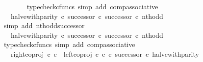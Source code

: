 \begin{isabellebody}
\ \ \ \ \ \ \isamarkupfalse%
\ {\isacharparenleft}{\kern0pt}typecheck{\isacharunderscore}{\kern0pt}cfuncs{\isacharcomma}{\kern0pt}\ simp\ add{\isacharcolon}{\kern0pt}\ comp{\isacharunderscore}{\kern0pt}associative{}{\isacharparenright}{\kern0pt}\isanewline
\ \ \ \ \isamarkupfalse%
\ \isamarkupfalse%
\ {\isachardoublequoteopen}{\isachardot}{\kern0pt}{\isachardot}{\kern0pt}{\isachardot}{\kern0pt}\ {\isacharequal}{\kern0pt}\ halve{\isacharunderscore}{\kern0pt}with{\isacharunderscore}{\kern0pt}parity\ {\isasymcirc}\isactrlsub c\ {\isacharparenleft}{\kern0pt}successor\ {\isasymcirc}\isactrlsub c\ successor{\isacharparenright}{\kern0pt}\ {\isasymcirc}\isactrlsub c\ nth{\isacharunderscore}{\kern0pt}odd{\isachardoublequoteclose}\isanewline
\ \ \ \ \ \ \isamarkupfalse%
\ {\isacharparenleft}{\kern0pt}simp\ add{\isacharcolon}{\kern0pt}\ nth{\isacharunderscore}{\kern0pt}odd{\isacharunderscore}{\kern0pt}successor{\isacharparenright}{\kern0pt}\isanewline
\ \ \ \ \isamarkupfalse%
\ \isamarkupfalse%
\ {\isachardoublequoteopen}{\isachardot}{\kern0pt}{\isachardot}{\kern0pt}{\isachardot}{\kern0pt}\ {\isacharequal}{\kern0pt}\ {\isacharparenleft}{\kern0pt}{\isacharparenleft}{\kern0pt}halve{\isacharunderscore}{\kern0pt}with{\isacharunderscore}{\kern0pt}parity\ {\isasymcirc}\isactrlsub c\ successor{\isacharparenright}{\kern0pt}\ {\isasymcirc}\isactrlsub c\ successor{\isacharparenright}{\kern0pt}\ {\isasymcirc}\isactrlsub c\ nth{\isacharunderscore}{\kern0pt}odd{\isachardoublequoteclose}\isanewline
\ \ \ \ \ \ \isamarkupfalse%
\ {\isacharparenleft}{\kern0pt}typecheck{\isacharunderscore}{\kern0pt}cfuncs{\isacharcomma}{\kern0pt}\ simp\ add{\isacharcolon}{\kern0pt}\ comp{\isacharunderscore}{\kern0pt}associative{}{\isacharparenright}{\kern0pt}\isanewline
\ \ \ \ \isamarkupfalse%
\ \isamarkupfalse%
\ {\isachardoublequoteopen}{\isachardot}{\kern0pt}{\isachardot}{\kern0pt}{\isachardot}{\kern0pt}\ {\isacharequal}{\kern0pt}\ {\isacharparenleft}{\kern0pt}{\isacharparenleft}{\kern0pt}right{\isacharunderscore}{\kern0pt}coproj\ {\isasymnat}\isactrlsub c\ {\isasymnat}\isactrlsub c\ {\isasymamalg}\ {\isacharparenleft}{\kern0pt}left{\isacharunderscore}{\kern0pt}coproj\ {\isasymnat}\isactrlsub c\ {\isasymnat}\isactrlsub c\ {\isasymcirc}\isactrlsub c\ successor{\isacharparenright}{\kern0pt}\ {\isasymcirc}\isactrlsub c\ halve{\isacharunderscore}{\kern0pt}with{\isacharunderscore}{\kern0pt}parity{\isacharparenright}{\kern0pt}\ \isanewline

\end{isabellebody}
